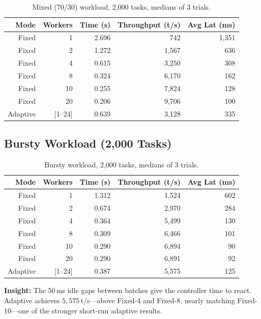\documentclass[12pt,a4paper]{article}
\begin{document}
\begin{table}[H]
\centering
\caption{Mixed (70/30) workload, 2,000 tasks, medians of 3 trials.}
\begin{tabular}{rrrrr}
\toprule
\textbf{Mode} & \textbf{Workers} & \textbf{Time (s)}
  & \textbf{Throughput (t/s)} & \textbf{Avg Lat (ms)} \\
\midrule
Fixed &  1 & 2.696 &   742 & 1,351 \\
Fixed &  2 & 1.272 & 1,567 &   636 \\
Fixed &  4 & 0.615 & 3,250 &   308 \\
Fixed &  8 & 0.324 & 6,170 &   162 \\
Fixed & 10 & 0.255 & 7,824 &   128 \\
Fixed & 20 & 0.206 & 9,706 &   100 \\
\rowcolor{rowblue}
Adaptive & [1--24] & 0.639 & 3,128 & 335 \\
\bottomrule
\end{tabular}
\label{tab:mixed}
\end{table}

\subsection{Bursty Workload (2,000 Tasks)}

\begin{table}[H]
\centering
\caption{Bursty workload, 2,000 tasks, medians of 3 trials.}
\begin{tabular}{rrrrr}
\toprule
\textbf{Mode} & \textbf{Workers} & \textbf{Time (s)}
  & \textbf{Throughput (t/s)} & \textbf{Avg Lat (ms)} \\
\midrule
Fixed &  1 & 1.312 & 1,524 & 602 \\
Fixed &  2 & 0.674 & 2,970 & 284 \\
Fixed &  4 & 0.364 & 5,499 & 130 \\
Fixed &  8 & 0.309 & 6,466 & 101 \\
Fixed & 10 & 0.290 & 6,894 &  90 \\
Fixed & 20 & 0.290 & 6,891 &  92 \\
\rowcolor{rowblue}
Adaptive & [1--24] & 0.387 & 5,575 & 125 \\
\bottomrule
\end{tabular}
\label{tab:bursty}
\end{table}

\textbf{Insight:}
The 50\,ms idle gaps between batches give the controller time to react.
Adaptive achieves $5,575$\,t/s---above Fixed-4 and Fixed-8, nearly
matching Fixed-10---one of the stronger short-run adaptive results.
\end{document}
